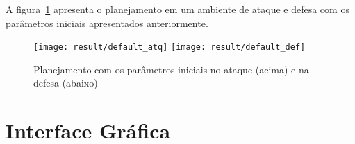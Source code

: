 A figura~\ref{fig:default} apresenta o planejamento em um
ambiente de ataque e defesa com os parâmetros iniciais
apresentados anteriormente.

\begin{figure}[H]
  \centering
  \texttt{[image: result/default\_atq]}
  \texttt{[image: result/default\_def]}
  \caption{Planejamento com os parâmetros iniciais no
           ataque (acima) e na defesa (abaixo)}\label{fig:default}
\end{figure}









\section{Interface Gráfica}
